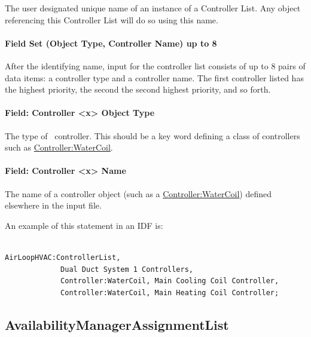 The user designated unique name of an instance of a Controller List. Any object referencing this Controller List will do so using this name.

\paragraph{Field Set (Object Type, Controller Name) up to 8}\label{field-set-object-type-controller-name-up-to-8}

After the identifying name, input for the controller list consists of up to 8 pairs of data items: a controller type and a controller name. The first controller listed has the highest priority, the second the second highest priority, and so forth.

\paragraph{Field: Controller \textless{}x\textgreater{} Object Type}\label{field-controller-x-object-type}

The type of~ controller. This should be a key word defining a class of controllers such as \hyperref[controllerwatercoil]{Controller:WaterCoil}.

\paragraph{Field: Controller \textless{}x\textgreater{} Name}\label{field-controller-x-name}

The name of a controller object (such as a \hyperref[controllerwatercoil]{Controller:WaterCoil}) defined elsewhere in the input file.

An example of this statement in an IDF is:

\begin{lstlisting}

AirLoopHVAC:ControllerList,
             Dual Duct System 1 Controllers,
             Controller:WaterCoil, Main Cooling Coil Controller,
             Controller:WaterCoil, Main Heating Coil Controller;
\end{lstlisting}

\subsection{AvailabilityManagerAssignmentList}\label{availabilitymanagerassignmentlist}

